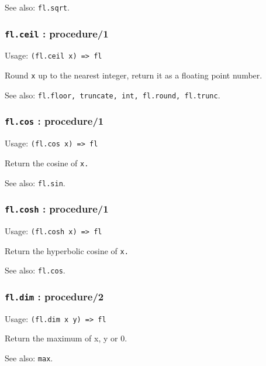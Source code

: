 \documentclass[
]{article}
\newcommand{\passthrough}[1]{#1}
\begin{document}
See also: \passthrough{\lstinline!fl.sqrt!}.

\hypertarget{fl.ceil-procedure1}{%
\subsubsection{\texorpdfstring{\texttt{fl.ceil} :
procedure/1}{fl.ceil : procedure/1}}\label{fl.ceil-procedure1}}

Usage: \passthrough{\lstinline!(fl.ceil x) => fl!}

Round \passthrough{\lstinline!x!} up to the nearest integer, return it
as a floating point number.

See also:
\passthrough{\lstinline!fl.floor, truncate, int, fl.round, fl.trunc!}.

\hypertarget{fl.cos-procedure1}{%
\subsubsection{\texorpdfstring{\texttt{fl.cos} :
procedure/1}{fl.cos : procedure/1}}\label{fl.cos-procedure1}}

Usage: \passthrough{\lstinline!(fl.cos x) => fl!}

Return the cosine of \passthrough{\lstinline!x.!}

See also: \passthrough{\lstinline!fl.sin!}.

\hypertarget{fl.cosh-procedure1}{%
\subsubsection{\texorpdfstring{\texttt{fl.cosh} :
procedure/1}{fl.cosh : procedure/1}}\label{fl.cosh-procedure1}}

Usage: \passthrough{\lstinline!(fl.cosh x) => fl!}

Return the hyperbolic cosine of \passthrough{\lstinline!x.!}

See also: \passthrough{\lstinline!fl.cos!}.

\hypertarget{fl.dim-procedure2}{%
\subsubsection{\texorpdfstring{\texttt{fl.dim} :
procedure/2}{fl.dim : procedure/2}}\label{fl.dim-procedure2}}

Usage: \passthrough{\lstinline!(fl.dim x y) => fl!}

Return the maximum of x, y or 0.

See also: \passthrough{\lstinline!max!}.
\end{document}
